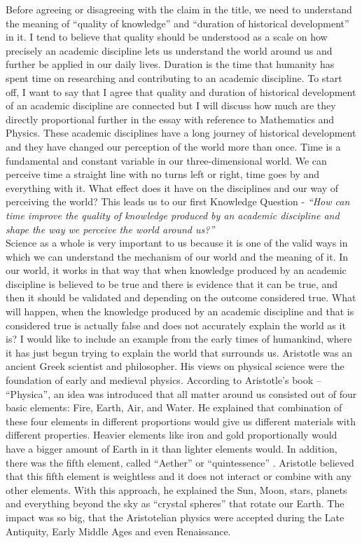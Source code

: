 \documentclass[12pt,a4paper]{article}
\begin{document}
Before agreeing or disagreeing with the claim in the title, we need to understand the meaning of ``quality of knowledge'' and
``duration of historical development'' in it. I tend to believe that quality should be understood as a scale on how precisely an academic discipline lets us understand the world around us and further be applied in our daily lives. Duration is the time that humanity has spent time on researching and contributing to an academic discipline. To start off, I want to say that I agree that quality and duration of historical development of an academic discipline are connected but I will discuss how much are they directly proportional further in the essay with reference to Mathematics and Physics. These academic disciplines have a long journey of historical development and they have changed our perception of the world more than once. Time is a fundamental and constant variable in our three-dimensional world\cite{time}.  We can perceive time a straight line with no turns left or right, time goes by and everything with it. What effect does it have on the disciplines and our way of perceiving the world? This leads us to our first Knowledge Question - \textit{“How can time improve the quality of knowledge produced by an academic discipline and shape the way we perceive the world around us?”}\\

Science as a whole is very important to us because it is one of the valid ways in which we can understand the mechanism of our world and the meaning of it. In our world, it works in that way that when knowledge produced by an academic discipline is believed to be true and there is evidence that it can be true, and then it should be validated and depending on the outcome considered true. What will happen, when the knowledge produced by an academic discipline and that is considered true is actually false and does not accurately explain the world as it is? I would like to include an example from the early times of humankind, where it has just begun trying to explain the world that surrounds us. Aristotle was an ancient Greek scientist and philosopher. His views on physical science were the foundation of early and medieval physics. According to Aristotle’s book – “Physica”, an idea was introduced that all matter around us consisted out of four basic elements: Fire, Earth, Air, and Water\cite{aether}. He explained that combination of these four elements in different proportions would give us different materials with different properties. Heavier elements like iron and gold proportionally would have a bigger amount of Earth in it than lighter elements would. In addition, there was the fifth element, called “Aether” or “quintessence” . Aristotle believed that this fifth element is weightless and it does not interact or combine with any other elements. With this approach, he explained the Sun, Moon, stars, planets and everything beyond the sky as “crystal spheres” that rotate our Earth. The impact was so big, that the Aristotelian physics were accepted during the Late Antiquity, Early Middle Ages and even Renaissance. \\
\end{document}
